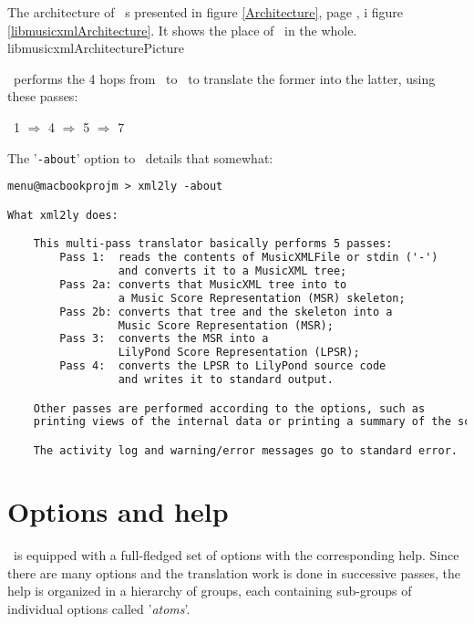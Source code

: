 \documentclass[12pt,a4paper]{article}
\begin{document}
The architecture of \lib\ s presented in figure \ref {Architecture}, page \pageref {Architecture}, i figure \ref{libmusicxmlArchitecture}.
It shows the place of \xmlToLy\ in the whole.
{libmusicxmlArchitecturePicture}

\xmlToLy\ performs the 4 hops from \mxml\ to \lily\ to translate the former into the latter, using these passes:

\tab\ 1 $\Rightarrow$ 4 $\Rightarrow$ 5 $\Rightarrow$ 7

The '{\tt -about}' option to \xmlToLy\ details that somewhat:
\begin{lstlisting}[language=XML]
menu@macbookprojm > xml2ly -about

What xml2ly does:

    This multi-pass translator basically performs 5 passes:
        Pass 1:  reads the contents of MusicXMLFile or stdin ('-')
                 and converts it to a MusicXML tree;
        Pass 2a: converts that MusicXML tree into to
                 a Music Score Representation (MSR) skeleton;
        Pass 2b: converts that tree and the skeleton into a
                 Music Score Representation (MSR);
        Pass 3:  converts the MSR into a
                 LilyPond Score Representation (LPSR);
        Pass 4:  converts the LPSR to LilyPond source code
                 and writes it to standard output.

    Other passes are performed according to the options, such as
    printing views of the internal data or printing a summary of the score.

    The activity log and warning/error messages go to standard error.
\end{lstlisting}


\section{Options and help}

\xmlToLy\ is equipped with a full-fledged set of options with the corresponding help. Since there are many options and the translation work is done in successive passes, the help is organized in a hierarchy of groups, each containing sub-groups of individual options called '{\it atoms}'.
\end{document}
